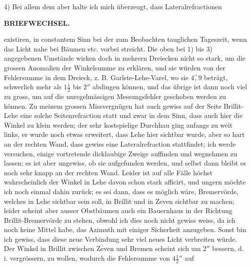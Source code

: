 \par\noindent\hspace*{\parindent}4) Bei allem dem aber halte ich mich überzeugt, dass Lateralrefractionen
\par\medskip\noindent\makebox[.86\linewidth][r]{62\textsuperscript{*}}\par

\par\clearpage
\noindent{}\hfill{\small\textbf{BRIEFWECHSEL.}}\hfill\null\par\medskip
\noindent existiren, in constantem Sinn bei der zum Beobachten tauglichen Tageszeit, wenn das Licht nahe bei Bäumen etc. vorbei streicht. Die oben bei 1) bis 3) angegebenen Umstände wirken doch in mehrern Dreiecken nicht so stark, um die grossen Anomalien der Winkelsumme zu erklären, und sie würden von der Fehlersumme in dem Dreieck, z. B. Garlste-Lehe-Varel, wo sie $4\overset{\prime\prime}{,}9$ beträgt, schwerlich mehr als $1\frac12$ bis $2''$ abdingen können, und das übrige ist dann noch viel zu gross, um auf die unregelmässigen Messungsfehler geschoben werden zu können. Zu meinem grossen Missvergnügen hat auch gewiss auf der Seite Brillit-Lehe eine solche Seitenrefraction statt und zwar in dem Sinn, dass auch hier die Winkel zu klein werden; der sehr kostspielige Durchhau ging anfangs zu weit links, er wurde noch etwas erweitert, dass Lehe hier sichtbar wurde, aber so hart an der rechten Wand, dass gewiss eine Lateralrefraction stattfindet; ich werde versuchen, einige vortretende dicklaubige Zweige auffinden und wegnehmen zu lassen; es ist aber ungewiss, ob sie aufgefunden werden, und selbst dann bleibt es noch sehr knapp an der rechten Wand. Leider ist auf alle Fälle höchst wahrscheinlich der Winkel in Lehe davon schon stark afficirt, und ungern möchte ich noch einmal dahin zurück; es sei dann, dass es möglich wäre, Bremervörde, welches in Lehe sichtbar sein soll, in Brillit und in Zeven sichtbar zu machen; leider scheint aber ausser Obstbäumen auch ein Bauernhaus in der Richtung Brillit-Bremervörde zu stehen, obwohl ich dies noch nicht gewiss weiss, da ich noch keine Mittel habe, das Azimuth mit einiger Sicherheit anzugeben. Sonst bin ich gewiss, dass diese neue Verbindung sehr viel neues Licht verbreiten würde. Der Winkel in Brillit zwischen Zeven und Bremen scheint sich um $2''$ bessern, d. i. vergrössern, zu wollen, wodurch die Fehlersumme von $4\frac12{}''$ auf
